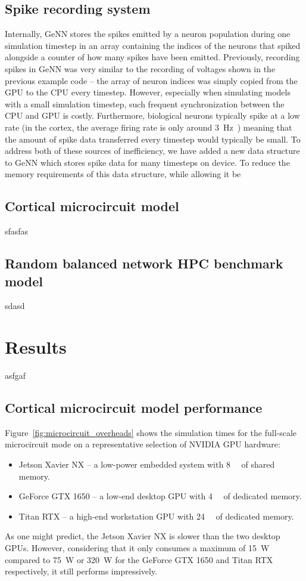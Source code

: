 \documentclass[utf8]{frontiersSCNS} %
\begin{document}
\subsection{Spike recording system}
\label{sec:methods/spike_recording}
Internally, GeNN stores the spikes emitted by a neuron population during one simulation timestep in an array containing the indices of the neurons that spiked alongside a counter of how many spikes have been emitted.
Previously, recording spikes in GeNN was very similar to the recording of voltages shown in the previous example code -- the array of neuron indices was simply copied from the GPU to the CPU every timestep.
However, especially when simulating models with a small simulation timestep, such frequent synchronization between the CPU and GPU is costly.
Furthermore, biological neurons typically spike at a low rate (in the cortex, the average firing rate is only around \SI{3}{\hertz}~\citep{Buzsaki2014}) meaning that the amount of spike data transferred every timestep would typically be small.
To address both of these sources of inefficiency, we have added a new data structure to GeNN which stores spike data for many timesteps on device.
To reduce the memory requirements of this data structure, while  allowing it be 

\subsection{Cortical microcircuit model}
sfasfas

\subsection{Random balanced network HPC benchmark model}
sdasd

\section{Results}
asfgaf

\subsection{Cortical microcircuit model performance}
Figure~\ref{fig:microcircuit_overheads} shows the simulation times for the full-scale microcircuit mode on a representative selection of NVIDIA GPU hardware:
%
\begin{itemize}
    \item Jetson Xavier NX -- a low-power embedded system with \SI{8}{\giga\byte} of shared memory.
    \item GeForce GTX 1650 -- a low-end desktop GPU with \SI{4}{\giga\byte} of dedicated memory.
    \item Titan RTX -- a high-end workstation GPU with \SI{24}{\giga\byte} of dedicated memory.
\end{itemize}
%
As one might predict, the Jetson Xavier NX is slower than the two desktop GPUs.
However, considering that it only consumes a maximum of \SI{15}{\watt} compared to \SI{75}{\watt} or \SI{320}{\watt} for the GeForce GTX 1650 and Titan RTX respectively, it still performs impressively.
\end{document}
